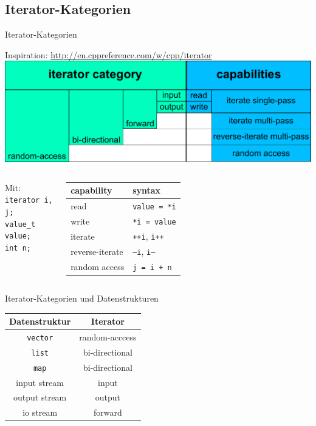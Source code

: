 \subsection{Iterator-Kategorien}

\begin{frame}{Iterator-Kategorien}
	\footnotesize
	
	Inspiration: \url{http://en.cppreference.com/w/cpp/iterator}
	\vspace{0.5em}
	\includegraphics[width=\textwidth]{images/iterator-categories}
	
	\vspace{0.5em}
	\pause
	
	\begin{columns}
		\hspace{13em}
			Mit:\\
			\texttt{iterator i, j;}	\\
			\texttt{value\_t value;}	\\
			\texttt{int n;}	\\
			
			\begin{tabular}{l|l}
				\textbf{capability}	&	\textbf{syntax}	\\
				\hline
				read	&	\texttt{value = *i}	\\
				write	&	\texttt{*i = value}	\\
				iterate	&	\texttt{++i}, \texttt{i++}	\\
				reverse-iterate	&	\texttt{--i}, \texttt{i--}	\\
				random access &	\texttt{j = i + n}	\\
			\end{tabular}
	\end{columns}
\end{frame}

\begin{frame}{Iterator-Kategorien und Datenstrukturen}
	\begin{center}
		\begin{tabular}{c|c}
			\textbf{Datenstruktur}	&	\textbf{Iterator}	\\
			\hline
			\texttt{vector}	&	random-acccess	\\
			\texttt{list}	&	bi-directional	\\
			\texttt{map}	&	bi-directional	\\
			input stream	&	input	\\
			output stream	&	output	\\
			io stream		&	forward	\\
		\end{tabular}
	\end{center}
\end{frame}
